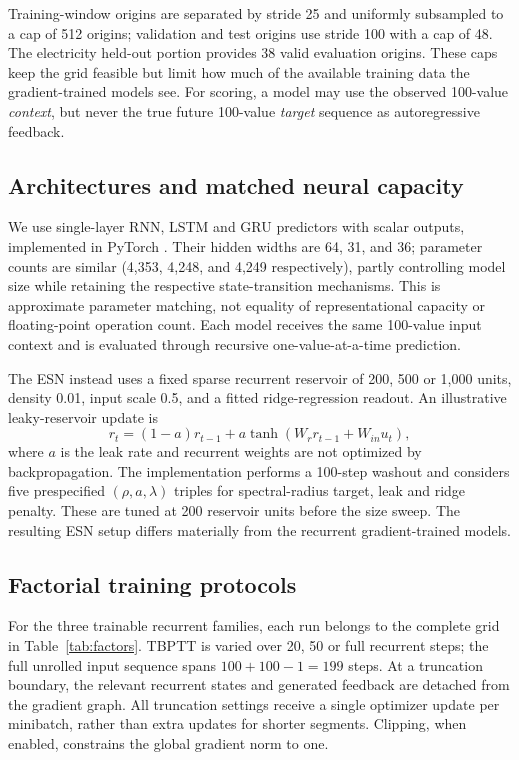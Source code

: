 \documentclass[final,5p,times,twocolumn]{elsarticle}
\begin{document}
Training-window origins are separated by stride 25 and uniformly subsampled to a cap of 512 origins; validation and test origins use stride 100 with a cap of 48. The electricity held-out portion provides 38 valid evaluation origins. These caps keep the grid feasible but limit how much of the available training data the gradient-trained models see. For scoring, a model may use the observed 100-value \emph{context}, but never the true future 100-value \emph{target} sequence as autoregressive feedback.

\subsection{Architectures and matched neural capacity}
We use single-layer RNN, LSTM and GRU predictors with scalar outputs, implemented in PyTorch \cite{paszke2019pytorch}. Their hidden widths are 64, 31, and 36; parameter counts are similar (4,353, 4,248, and 4,249 respectively), partly controlling model size while retaining the respective state-transition mechanisms. This is approximate parameter matching, not equality of representational capacity or floating-point operation count. Each model receives the same 100-value input context and is evaluated through recursive one-value-at-a-time prediction.

The ESN instead uses a fixed sparse recurrent reservoir of 200, 500 or 1,000 units, density 0.01, input scale 0.5, and a fitted ridge-regression readout. An illustrative leaky-reservoir update is
\begin{equation}
 r_t=(1-a)r_{t-1}+a\tanh(W_r r_{t-1}+W_{in}u_t),
 \label{eq:esn}
\end{equation}
where $a$ is the leak rate and recurrent weights are not optimized by backpropagation. The implementation performs a 100-step washout and considers five prespecified $(\rho,a,\lambda)$ triples for spectral-radius target, leak and ridge penalty. These are tuned at 200 reservoir units before the size sweep. The resulting ESN setup differs materially from the recurrent gradient-trained models.

\subsection{Factorial training protocols}
For the three trainable recurrent families, each run belongs to the complete grid in Table~\ref{tab:factors}. TBPTT is varied over 20, 50 or full recurrent steps; the full unrolled input sequence spans $100+100-1=199$ steps. At a truncation boundary, the relevant recurrent states and generated feedback are detached from the gradient graph. All truncation settings receive a single optimizer update per minibatch, rather than extra updates for shorter segments. Clipping, when enabled, constrains the global gradient norm to one.
\end{document}
